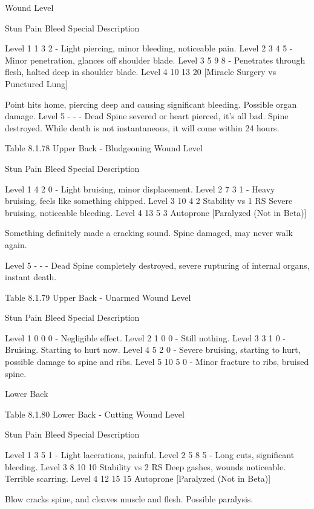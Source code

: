 \documentclass[oneside,11pt,english]{book}
\begin{document}
Wound 
Level 

Stun Pain Bleed Special Description 

Level 1 1 3 2 - Light piercing, minor bleeding, noticeable pain. 
Level 2 3 4 5 - Minor penetration, glances off shoulder blade. 
Level 3 5 9 8 - Penetrates through flesh, halted deep in shoulder blade. 
Level 4 10 13 20 [Miracle Surgery vs 
Punctured Lung] 

Point hits home, piercing deep and causing significant 
bleeding. Possible organ damage. 
Level 5 - - - Dead Spine severed or heart pierced, it’s all bad. Spine 
destroyed. While death is not instantaneous, it will come 
within 24 hours. 

 
Table 8.1.78 Upper Back - Bludgeoning 
Wound 
Level 

Stun Pain Bleed Special Description 

Level 1 4 2 0 - Light bruising, minor displacement. 
Level 2 7 3 1 - Heavy bruising, feels like something chipped. 
Level 3 10 4 2 Stability vs 1 RS Severe bruising, noticeable bleeding. 
Level 4 13 5 3 Autoprone 
[Paralyzed (Not in 
Beta)] 

Something definitely made a cracking sound. Spine 
damaged, may never walk again. 

Level 5 - - - Dead Spine completely destroyed, severe rupturing of internal 
organs, instant death. 

 
Table 8.1.79 Upper Back - Unarmed 
Wound 
Level 

Stun Pain Bleed Special Description 

Level 1 0 0 0 - Negligible effect. 
Level 2 1 0 0 - Still nothing. 
Level 3 3 1 0 - Bruising. Starting to hurt now. 
Level 4 5 2 0 - Severe bruising, starting to hurt, possible damage to spine and 
ribs. 
Level 5 10 5 0 - Minor fracture to ribs, bruised spine. 

 

 

Lower Back 


 

Table 8.1.80 Lower Back - Cutting 
Wound 
Level 

Stun Pain Bleed Special Description 

Level 1 3 5 1 - Light lacerations, painful. 
Level 2 5 8 5 - Long cuts, significant bleeding. 
Level 3 8 10 10 Stability vs 2 RS Deep gashes, wounds noticeable. Terrible scarring. 
Level 4 12 15 15 Autoprone 
[Paralyzed (Not in 
Beta)] 

Blow cracks spine, and cleaves muscle and flesh. 
Possible paralysis. 
\end{document}
